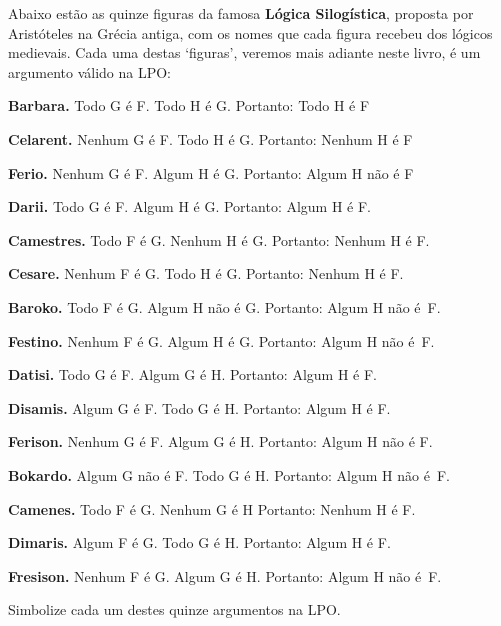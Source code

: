 \practiceproblems
\problempart
\label{pr.BarbaraEtc}
Abaixo estão as quinze figuras da famosa \textbf{Lógica Silogística}, proposta por Aristóteles na Grécia antiga, com os nomes que cada figura recebeu dos lógicos medievais.
Cada uma destas `figuras', veremos mais adiante neste livro, é um argumento válido na LPO:
\begin{earg}\footnotesize 
	\item \textbf{Barbara.} Todo G é F. Todo H é G. Portanto:  Todo H é F
	\item \textbf{Celarent.} Nenhum G é F. Todo H é G. Portanto: Nenhum H é F
	\item \textbf{Ferio.} Nenhum G é F. Algum H é G. Portanto: Algum H não é F
	\item \textbf{Darii.} Todo G é F. Algum H é G. Portanto: Algum H é F.
	\item \textbf{Camestres.} Todo F é G. Nenhum H é G. Portanto: Nenhum H é F.
	\item \textbf{Cesare.} Nenhum F é G. Todo H é G. Portanto: Nenhum H é F.
	\item \textbf{Baroko.} Todo F é G. Algum H não é G. Portanto: Algum H não é~F.
	\item \textbf{Festino.} Nenhum F é G. Algum H é G. Portanto: Algum H não é~F.
	\item \textbf{Datisi.} Todo G é F. Algum G é H. Portanto: Algum H é F.
	\item \textbf{Disamis.} Algum G é F. Todo G é H. Portanto: Algum H é F.
	\item \textbf{Ferison.} Nenhum G é F. Algum G é H. Portanto: Algum H não é F.
	\item \textbf{Bokardo.} Algum G não é F. Todo G é H. Portanto:  Algum H não é~F.
	\item \textbf{Camenes.} Todo F é G. Nenhum G é H Portanto: Nenhum H é F.
	\item \textbf{Dimaris.} Algum F é G. Todo G é H. Portanto: Algum H é F.
	\item \textbf{Fresison.} Nenhum F é G. Algum G é H. Portanto: Algum H não é~F.
\end{earg}
Simbolize cada um destes quinze argumentos na LPO.

\

